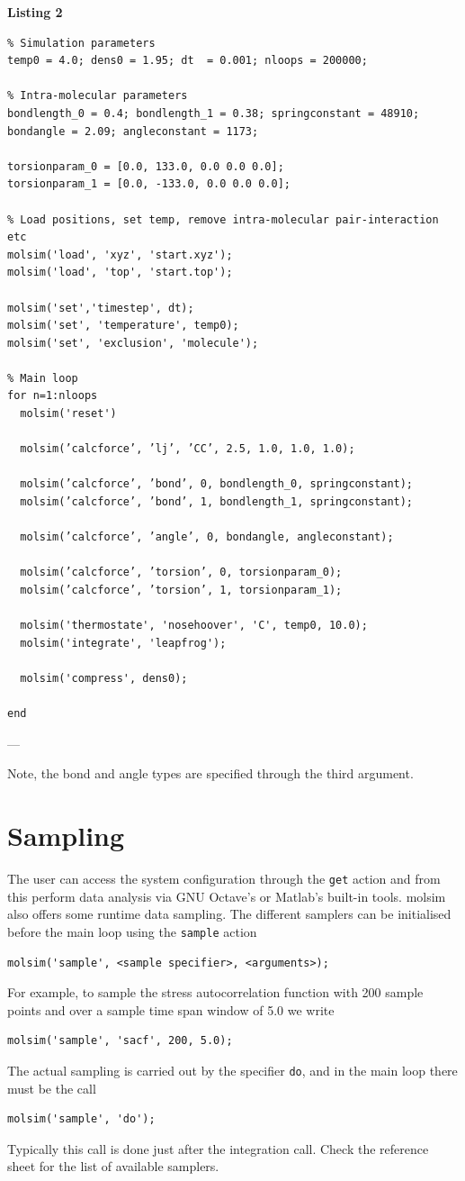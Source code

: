 \documentclass[11pt]{article}
\begin{document}
\noindent \textbf{Listing 2}
\begin{verbatim}
% Simulation parameters
temp0 = 4.0; dens0 = 1.95; dt  = 0.001; nloops = 200000;

% Intra-molecular parameters
bondlength_0 = 0.4; bondlength_1 = 0.38; springconstant = 48910;
bondangle = 2.09; angleconstant = 1173;

torsionparam_0 = [0.0, 133.0, 0.0 0.0 0.0]; 
torsionparam_1 = [0.0, -133.0, 0.0 0.0 0.0];

% Load positions, set temp, remove intra-molecular pair-interaction etc
molsim('load', 'xyz', 'start.xyz');
molsim('load', 'top', 'start.top');

molsim('set','timestep', dt);
molsim('set', 'temperature', temp0);
molsim('set', 'exclusion', 'molecule');

% Main loop
for n=1:nloops
  molsim('reset')

  molsim(’calcforce’, ’lj’, ’CC’, 2.5, 1.0, 1.0, 1.0);
  
  molsim(’calcforce’, ’bond’, 0, bondlength_0, springconstant);
  molsim(’calcforce’, ’bond’, 1, bondlength_1, springconstant);
  
  molsim(’calcforce’, ’angle’, 0, bondangle, angleconstant);

  molsim(’calcforce’, ’torsion’, 0, torsionparam_0);
  molsim(’calcforce’, ’torsion’, 1, torsionparam_1);
  
  molsim('thermostate', 'nosehoover', 'C', temp0, 10.0);
  molsim('integrate', 'leapfrog');

  molsim('compress', dens0);

end
\end{verbatim}

\noindent ---

\noindent Note, the bond and angle types are specified through the third
argument.  

\section{Sampling}
The user can access the system configuration through the \verb!get! action and
from this perform data analysis via GNU Octave's or Matlab's built-in
tools. \textsf{molsim} also offers some runtime data sampling. The different
samplers can be initialised before the main loop using the \verb!sample! action
\begin{verbatim}
molsim('sample', <sample specifier>, <arguments>);
\end{verbatim}
For example, to sample the stress autocorrelation function with 200 sample points
and over a sample time span window of 5.0 we write
\begin{verbatim}
molsim('sample', 'sacf', 200, 5.0);
\end{verbatim}
The actual sampling is carried out by the specifier \verb!do!, and in the main
loop there must be the call
\begin{verbatim}
molsim('sample', 'do'); 
\end{verbatim}
Typically this call is done just after the integration call. Check the reference
sheet for the list of available samplers. 
\end{document}
